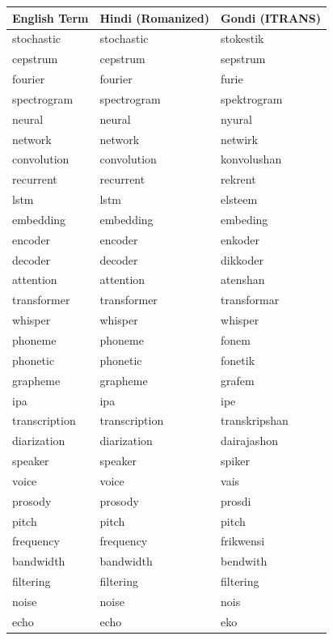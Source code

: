\documentclass[10pt,twocolumn,letterpaper]{article}
\begin{document}
\begin{longtable}{|p{4cm}|p{4cm}|p{4cm}|}
\hline
\textbf{English Term} & \textbf{Hindi (Romanized)} & \textbf{Gondi (ITRANS)} \\ \hline
\endhead
\hline \endfoot
stochastic & stochastic & stokestik \\ \hline
cepstrum & cepstrum & sepstrum \\ \hline
fourier & fourier & furie \\ \hline
spectrogram & spectrogram & spektrogram \\ \hline
neural & neural & nyural \\ \hline
network & network & netwirk \\ \hline
convolution & convolution & konvolushan \\ \hline
recurrent & recurrent & rekrent \\ \hline
lstm & lstm & elsteem \\ \hline
embedding & embedding & embeding \\ \hline
encoder & encoder & enkoder \\ \hline
decoder & decoder & dikkoder \\ \hline
attention & attention & atenshan \\ \hline
transformer & transformer & transformar \\ \hline
whisper & whisper & whisper \\ \hline
phoneme & phoneme & fonem \\ \hline
phonetic & phonetic & fonetik \\ \hline
grapheme & grapheme & grafem \\ \hline
ipa & ipa & ipe \\ \hline
transcription & transcription & transkripshan \\ \hline
diarization & diarization & dairajashon \\ \hline
speaker & speaker & spiker \\ \hline
voice & voice & vais \\ \hline
prosody & prosody & prosdi \\ \hline
pitch & pitch & pitch \\ \hline
frequency & frequency & frikwensi \\ \hline
bandwidth & bandwidth & bendwith \\ \hline
filtering & filtering & filtering \\ \hline
noise & noise & nois \\ \hline
echo & echo & eko \\ \hline

\end{longtable}
\end{document}
